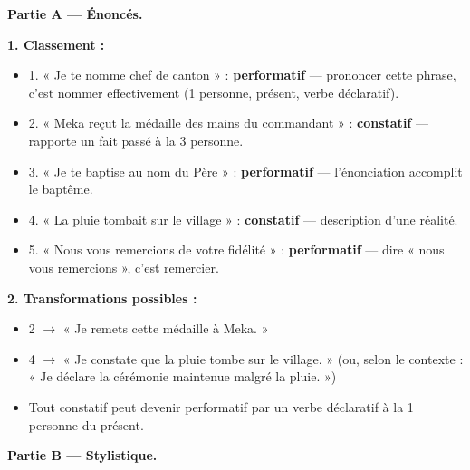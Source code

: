 \documentclass[11pt]{article}
\begin{document}
\begin{corrige}
\textbf{Partie A — Énoncés.}

\textbf{1. Classement :}
\begin{itemize}
\item 1. « Je te nomme chef de canton » : \textbf{performatif} — prononcer cette phrase, c'est nommer effectivement (1 personne, présent, verbe déclaratif).
\item 2. « Meka reçut la médaille des mains du commandant » : \textbf{constatif} — rapporte un fait passé à la 3 personne.
\item 3. « Je te baptise au nom du Père » : \textbf{performatif} — l'énonciation accomplit le baptême.
\item 4. « La pluie tombait sur le village » : \textbf{constatif} — description d'une réalité.
\item 5. « Nous vous remercions de votre fidélité » : \textbf{performatif} — dire « nous vous remercions », c'est remercier.
\end{itemize}
\textbf{2. Transformations possibles :}
\begin{itemize}
\item 2 $\rightarrow$ « Je remets cette médaille à Meka. »
\item 4 $\rightarrow$ « Je constate que la pluie tombe sur le village. » (ou, selon le contexte : « Je déclare la cérémonie maintenue malgré la pluie. »)
\item Tout constatif peut devenir performatif par un verbe déclaratif à la 1 personne du présent.
\end{itemize}

\textbf{Partie B — Stylistique.}


\end{corrige}
\end{document}
